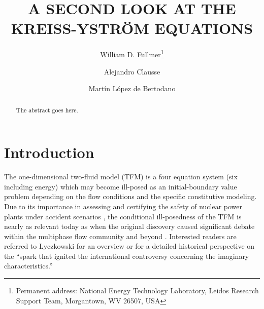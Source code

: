 \documentclass{ws-ijbc}
\begin{document}
\catchline{}{}{}{}{} %


\title{A SECOND LOOK AT THE KREISS-YSTR{\"O}M EQUATIONS}

\author{William D. Fullmer\footnote{Permanent address: National Energy Technology Laboratory, Leidos Research Support Team, Morgantown, WV 26507, USA}}
\address{Leidos, Morgantown, WV 26507, USA\\ 
w.d.fullmer@gmail.com}

\author{Alejandro Clausse}
\address{CNEA-CONICET and University of Central Buenos Aires, 7000 Tandil, Argentina\\ }


\author{Mart{\'i}n L{\'o}pez de Bertodano}
\address{School of Nuclear Engineering, Purdue University, West Lafayette, IN 47907, USA\\ 
}%

\maketitle

\begin{history}
\end{history}

\begin{abstract}
The abstract goes here. 
\end{abstract}


\section{Introduction}
\label{sec.intro}
The one-dimensional two-fluid model (TFM) is a four equation system (six including energy) which may become ill-posed as an initial-boundary value problem depending on the flow conditions and the specific constitutive modeling. Due to its importance in assessing and certifying the safety of nuclear power plants under accident scenarios \cite{trace, relap}, the conditional ill-posedness of the TFM is nearly as relevant today \cite{ahn17, relap7} as when the original discovery caused significant debate within the multiphase flow community and beyond \cite{gidaspow74}. Interested readers are referred to Lyczkowski \cite{lyczkowski10} for an overview or \cite{lyczkowski} for a detailed historical perspective on the ``spark that ignited the international controversy concerning the imaginary characteristics.''
\end{document}
